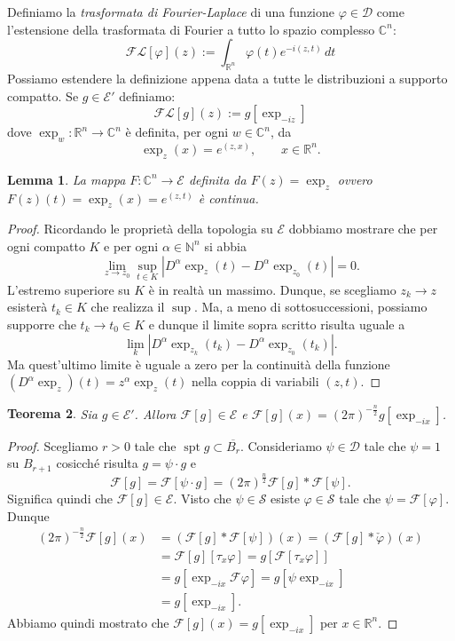 \documentclass[italian,a4paper,oneside,headinclude]{scrbook}
\renewcommand{\phi}{\varphi}
\newcommand{\D}{\mathcal D}
\newcommand{\E}{\mathcal E}
\newcommand{\F}{\mathcal F}
\newcommand{\FL}{\mathcal F\!\mathcal L}
\renewcommand{\S}{\mathcal S}
\newcommand{\CC}{\mathbb C}
\newcommand{\NN}{\mathbb N}
\newcommand{\RR}{\mathbb R}
\newcommand{\abs}[1]{{\left|#1\right|}}
\newcommand{\defeq}{:=}
\DeclareMathOperator{\spt}{spt}
\newtheorem{theorem}{Teorema}
\newtheorem{lemma}[theorem]{Lemma}
\begin{document}
Definiamo la \emph{trasformata di Fourier-Laplace}
\marginpar{$\FL{[\phi]}$}
di una funzione
$\phi\in \D$ come
l'estensione della trasformata di Fourier a tutto lo spazio complesso
$\CC^n$:
\begin{equation}\label{eq:Cfourier}
  \FL[\phi](z) \defeq \int_{\RR^n} \phi(t) e^{-i(z,t)}\, dt
\end{equation}
Possiamo estendere la definizione appena data a tutte le distribuzioni
a supporto compatto.
Se $g\in \E'$ definiamo:
\marginpar{$\FL{[g]}$}
\begin{equation}\label{eq:Cfourier_dist}
\FL[g](z) \defeq g[\exp_{-iz}]
\end{equation}
dove $\exp_w\colon \RR^n \to \CC^n$ è definita, per ogni $w\in \CC^n$, da
\[
\exp_z(x) = e^{(z,x)},\qquad x\in \RR^n.
\]

\begin{lemma}
  La mappa $F\colon \CC^n \to \E$ definita da $F(z) = \exp_z$ ovvero $F(z)(t) = \exp_z(x) = e^{(z,t)}$ è continua.
\end{lemma}
\begin{proof}
  Ricordando le proprietà della topologia su $\E$
  dobbiamo mostrare che per ogni
  compatto $K$ e per ogni $\alpha \in \NN^n$ si abbia
  \[
  \lim_{z\to z_0} \sup_{t\in K} \abs{D^\alpha\exp_z(t) -
    D^\alpha\exp_{z_0}(t)} = 0.
  \]
  L'estremo superiore su $K$ è in realtà un massimo. Dunque, se
  scegliamo $z_k \to z$
  esisterà
  $t_k\in K$ che realizza il $\sup$. Ma, a meno di sottosuccessioni,
  possiamo supporre che $t_k \to t_0\in K$ e dunque il limite sopra
  scritto risulta uguale a
  \[
  \lim_k \abs{D^\alpha \exp_{z_k}(t_k)- D^\alpha \exp_{z_0}(t_k)}.
  \]
  Ma quest'ultimo limite è uguale a zero per la continuità della
  funzione $(D^\alpha \exp_z)(t) = z^\alpha \exp_z(t)$
  nella coppia di variabili $(z,t)$.
\end{proof}


\begin{theorem}\label{th:def_FL}
  Sia $g\in \E'$.
  Allora $\F[g] \in \E$ e $\F[g](x) = (2\pi)^{-\frac n 2} g[\exp_{-ix}]$.
\end{theorem}
\begin{proof}
  Scegliamo $r>0$ tale che $\spt g \subset \overline{B_r}$.
  Consideriamo $\psi\in \D$ tale che $\psi = 1$ su $B_{r+1}$ cosicché
  risulta $g=\psi \cdot g$ e
  \[
  \F[g] = \F[\psi\cdot g] = (2\pi)^{\frac n 2}\F[g] * \F[\psi].
  \]
  Significa quindi che $\F[g]\in \E$. Visto che $\psi\in \S$ esiste
  $\phi\in \S$ tale che $\psi = \F[\phi]$. Dunque
  \begin{align*}
    (2\pi)^{-\frac n 2} \F[g](x) &=
    (\F[g] * \F[\psi])(x)
    = (\F[g] * \check \phi)(x) \\
    &= \F[g][\tau_x \phi]
    = g[\F[\tau_x \phi]] \\
    &= g[\exp_{-ix}\F\phi]
    = g[\psi \exp_{-ix}] \\
    &= g[\exp_{-ix}].
  \end{align*}
  Abbiamo quindi mostrato che $\F[g](x) = g[\exp_{-ix}]$ per
  $x\in \RR^n$.
\end{proof}
\end{document}
